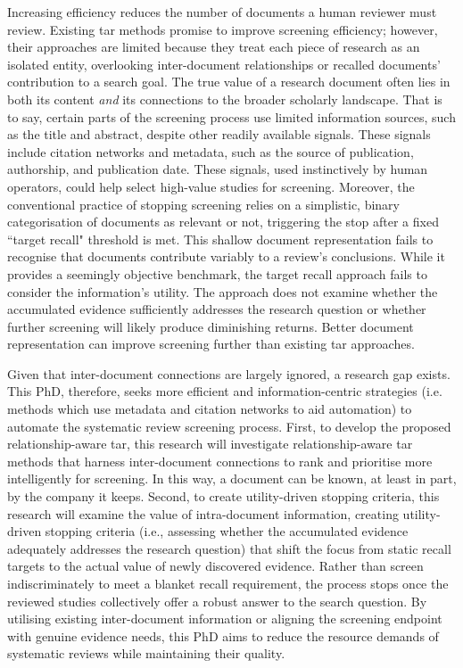 \documentclass[10pt,oneside]{book}
\begin{document}
Increasing efficiency reduces the number of documents a human reviewer must review. Existing \gls*{tar} methods promise to improve screening efficiency; however, their approaches are limited because they treat each piece of research as an isolated entity, overlooking inter-document relationships or recalled documents' contribution to a search goal. The true value of a research document often lies in both its content \emph{and} its connections to the broader scholarly landscape. That is to say, certain parts of the screening process use limited information sources, such as the title and abstract, despite other readily available signals. These signals include citation networks and metadata, such as the source of publication, authorship, and publication date. These signals, used instinctively by human operators, could help select high-value studies for screening. Moreover, the conventional practice of stopping screening relies on a simplistic, binary categorisation of documents as relevant or not, triggering the stop after a fixed ``target recall" threshold is met. This shallow document representation fails to recognise that documents contribute variably to a review's conclusions. While it provides a seemingly objective benchmark, the target recall approach fails to consider the information's utility. The approach does not examine whether the accumulated evidence sufficiently addresses the research question or whether further screening will likely produce diminishing returns. Better document representation can improve screening further than existing \gls*{tar} approaches. 

Given that inter-document connections are largely ignored, a research gap exists. This PhD, therefore, seeks more efficient and information-centric strategies  (i.e. methods which use metadata and citation networks to aid automation) to automate the systematic review screening process. First, to develop the proposed relationship-aware \gls*{tar}, this research will investigate relationship-aware \gls*{tar} methods that harness inter-document connections to rank and prioritise more intelligently for screening. In this way, a document can be known, at least in part, by the company it keeps. Second, to create utility-driven stopping criteria, this research will examine the value of intra-document information, creating utility-driven stopping criteria  (i.e., assessing whether the accumulated evidence adequately addresses the research question) that shift the focus from static recall targets to the actual value of newly discovered evidence. Rather than screen indiscriminately to meet a blanket recall requirement, the process stops once the reviewed studies collectively offer a robust answer to the search question. By utilising existing inter-document information or aligning the screening endpoint with genuine evidence needs, this PhD aims to reduce the resource demands of systematic reviews while maintaining their quality.
\end{document}
